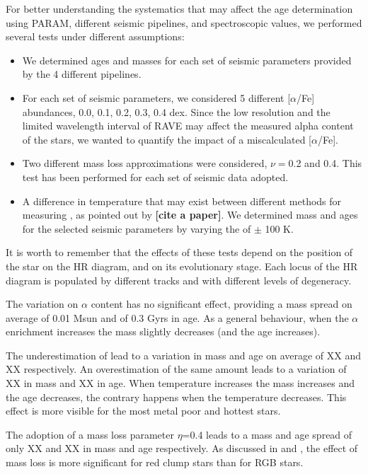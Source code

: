 \documentclass{aa}
\begin{document}
For better understanding the systematics that may affect the age determination using PARAM, different seismic pipelines, and spectroscopic values, we performed several tests under different assumptions:
\begin{itemize}
\item We determined ages and masses for each set of seismic parameters provided by the 4 different pipelines.
\item  For each set of seismic parameters, we considered 5 different [$\alpha$/Fe] abundances, 0.0, 0.1, 0.2, 0.3, 0.4 dex. Since the low resolution and the limited wavelength interval of RAVE may affect the measured alpha content of the stars, we wanted to quantify the impact of a miscalculated [$\alpha$/Fe]. 
\item Two different mass loss approximations were considered, $\nu=$0.2 and 0.4. This test has been performed for each set of seismic data adopted.
\item A difference in temperature that may exist between different methods for measuring \Teff, as pointed out by {\bf [cite a paper]}. We determined mass and ages for the selected seismic parameters by varying the \Teff of $\pm$ 100 K. 
\end{itemize}
It is worth to remember that the effects of these tests depend on the position of the star on the HR diagram, and on its evolutionary stage. Each locus of the HR diagram is populated by different tracks and with different levels of degeneracy. 

The variation on $\alpha$ content has no significant effect, providing a mass spread on average of 0.01 Msun and of 0.3 Gyrs in age. As a general behaviour, when the $\alpha$ enrichment increases the mass slightly decreases (and the age increases). 

The underestimation of \Teff lead to a variation in mass and age on average of XX and XX respectively. An overestimation of the same amount leads to a variation of XX in mass and XX in age. When temperature increases the mass increases and the age decreases, the contrary happens when the temperature decreases. This effect is more visible for the most metal poor and hottest stars.

The adoption of a mass loss parameter $\eta$=0.4 leads to a mass and age spread of only XX and XX in mass and age respectively. As discussed in \cite {Anders2016} and \cite{Casagrande2016}, the effect of mass loss is more significant for red clump stars than for RGB stars.
\end{document}
